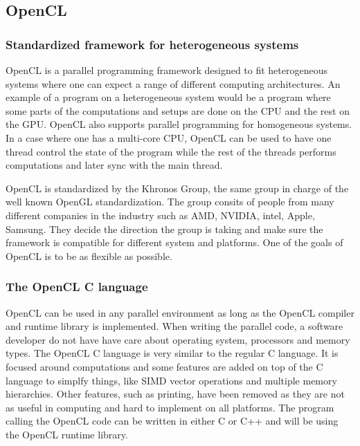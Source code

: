 \subsection{OpenCL}

\subsubsection{Standardized framework for heterogeneous systems}

OpenCL is a parallel programming framework designed to fit heterogeneous systems where one can expect a range of different computing architectures\cite{opencl}. An example of a program on a heterogeneous system would be a program where some parts of the computations and setups are done on the CPU and the rest on the GPU. OpenCL also supports parallel programming for homogeneous systems. In a case where one has a multi-core CPU, OpenCL can be used to have one thread control the state of the program while the rest of the threads performs computations and later sync with the main thread.
\newline

OpenCL is standardized by the Khronos Group, the same group in charge of the well known OpenGL standardization. The group consits of people from many different companies in the industry such as AMD, NVIDIA, intel, Apple, Samsung. They decide the direction the group is taking and make sure the framework is compatible for different system and platforms. One of the goals of OpenCL is to be as flexible as possible.
\newline

\subsubsection{The OpenCL C language}
OpenCL can be used in any parallel environment as long as the OpenCL compiler and runtime library is implemented. When writing the parallel code, a software developer do not have have care about operating system, processors and memory types. The OpenCL C language is very similar to the regular C language. It is focused around computations and some features are added on top of the C language to simplfy things, like SIMD vector operations and multiple memory hierarchies. Other features, such as printing, have been removed as they are not as useful in computing and hard to implement on all platforms. The program calling the OpenCL code can be written in either C or C++ and will be using the OpenCL runtime library. 
\newline

